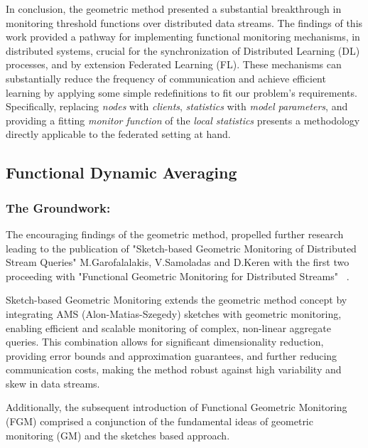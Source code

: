 In conclusion, the geometric method presented a substantial breakthrough in monitoring threshold functions over distributed data streams. The findings
of this work provided a pathway for implementing functional monitoring mechanisms, in distributed systems, crucial for the synchronization of Distributed
Learning (DL) processes, and by extension Federated Learning (FL). These mechanisms can substantially reduce the frequency of communication and achieve
efficient learning by applying some simple redefinitions to fit our problem's requirements. Specifically, replacing \emph{nodes} with \emph{clients},
\emph{statistics} with \emph{model parameters}, and providing a fitting \emph{monitor function} of the \emph{local statistics} presents a methodology
directly applicable to the federated setting at hand.

\subsection{Functional Dynamic Averaging}
\subsubsection{The Groundwork:} \label{sec:groundwork}

The encouraging findings of the geometric method\cite{sharfmanGeometricApproachMonitoring2010}, propelled further research leading to
the publication of "Sketch-based Geometric Monitoring of Distributed Stream Queries"\cite{garofalakisSketchbasedGeometricMonitoring2013}
M.Garofalalakis, V.Samoladas and D.Keren with the first two proceeding with "Functional Geometric Monitoring for Distributed Streams"
~\cite{samoladasFunctionalGeometricMonitoring2019}.

Sketch-based Geometric Monitoring\cite{garofalakisSketchbasedGeometricMonitoring2013}
extends the geometric method concept by integrating AMS (Alon-Matias-Szegedy) sketches\cite{alonnogaSpaceComplexityApproximating1996}
with geometric monitoring, enabling efficient and scalable monitoring of complex, non-linear aggregate queries.
This combination allows for significant dimensionality reduction, providing error bounds and approximation guarantees,
and further reducing communication costs, making the method robust against high variability and skew in data streams.

Additionally, the subsequent introduction of Functional Geometric Monitoring (FGM) comprised a conjunction of the
fundamental ideas of geometric monitoring\cite{sharfmanGeometricApproachMonitoring2010} (GM) and the sketches based
approach\cite{garofalakisSketchbasedGeometricMonitoring2013}.

